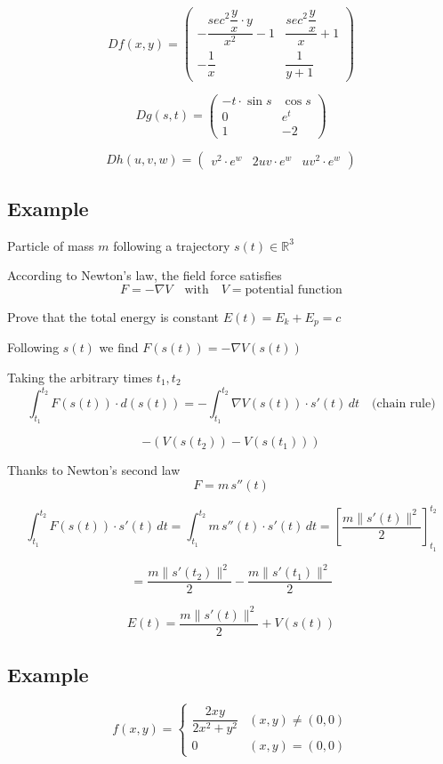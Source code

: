 \documentclass[11pt]{article}
\begin{document}
\[
Df(x, y) = \begin{pmatrix}
-\dfrac{sec^2 \dfrac{y}{x} \cdot y}{x^2} - 1 & \dfrac{sec^2 \dfrac{y}{x}}{x} + 1 \\
-\dfrac{1}{x} & \dfrac{1}{y+1}
\end{pmatrix}
\]

\[
Dg(s, t) = \begin{pmatrix}
-t \cdot \sin s & \cos s \\
0 & e^t \\
1 & -2
\end{pmatrix}
\]

\[
Dh(u, v, w) = \begin{pmatrix}
v^2 \cdot e^w & 2uv \cdot e^w & uv^2 \cdot e^w
\end{pmatrix}
\]

\subsection*{Example}

Particle of mass $m$ following a trajectory $s(t) \in \mathbb{R}^3$

According to Newton's law, the field force satisfies
\[ F = -\nabla V \quad \text{with} \quad V = \text{potential function} \]

Prove that the total energy is constant $E(t) = E_k + E_p = c$

Following $s(t)$ we find $F(s(t)) = -\nabla V(s(t))$

Taking the arbitrary times $t_1, t_2$
\[ \int_{t_1}^{t_2} F(s(t)) \cdot d(s(t)) = -\int_{t_1}^{t_2} \nabla V(s(t)) \cdot s'(t) \, dt \quad \text{(chain rule)} \]

\[ -\left( V(s(t_2)) - V(s(t_1)) \right) \]

Thanks to Newton's second law
\[ F = m \, s''(t) \]

\[ \int_{t_1}^{t_2} F(s(t)) \cdot s'(t) \, dt = \int_{t_1}^{t_2} m \, s''(t) \cdot s'(t) \, dt = \left[ \frac{m \| s'(t) \|^2}{2} \right]_{t_1}^{t_2} \]

\[ = \frac{m \| s'(t_2) \|^2}{2} - \frac{m \| s'(t_1) \|^2}{2} \]

\[ E(t) = \frac{m \| s'(t) \|^2}{2} + V(s(t)) \]

\subsection*{Example}
$$ f(x,y) = \begin{cases} \dfrac{2xy}{2x^2 + y^2} & (x,y) \neq (0,0) \\ 0 & (x,y) = (0,0) \end{cases} $$
\end{document}
